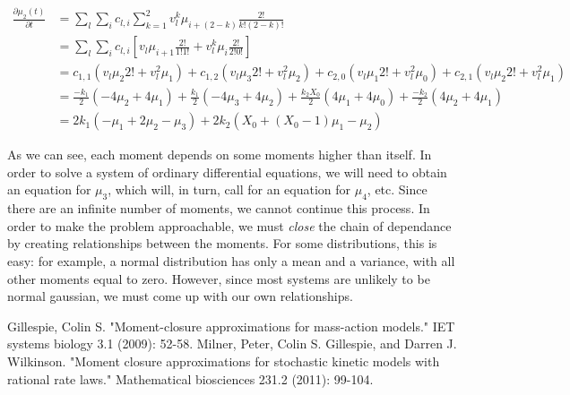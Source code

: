 \documentclass[a4paper,10pt]{article}
\begin{document}
\begin{align*}
 \frac{\partial \mu_2 (t)}{\partial t} &= \sum_l \sum_i c_{l,i} \sum_{k=1}^2 v_l^k \mu_{i+(2-k)} \frac{2!}{k!(2-k)!}\\
 &=\sum_l \sum_i c_{l,i} \left[ v_l \mu_{i+1} \frac{2!}{1!1!}+v_l^k \mu_{i} \frac{2!}{2!0!}\right]\\
 &= c_{1,1}(v_l \mu_{2} 2!+v_l^2 \mu_1)+c_{1,2}(v_l \mu_{3} 2!+v_l^2 \mu_2)+c_{2,0}(v_l \mu_{1} 2!+v_l^2 \mu_0)+c_{2,1}(v_l \mu_{2} 2!+v_l^2 \mu_1)\\
 &= \frac{-k_1}{2}(-4\mu_2+4\mu_1)+\frac{k_1}{2}(-4\mu_3+4\mu_2)+\frac{k_2 X_0}{2}(4\mu_1+4\mu_0)+\frac{-k_2}{2}(4\mu_2+4\mu_1)\\
 &=2k_1(-\mu_1+2\mu_2-\mu_3)+2k_2(X_0+(X_0-1)\mu_1-\mu_2)
\end{align*}
 
 As we can see, each moment depends on some moments higher than itself. In order to solve a system of ordinary differential equations, we will need to obtain an equation for $\mu_3$, which will, in turn, call for an equation for $\mu_4$, etc. Since there are an infinite number of moments, we cannot continue this process. In order to make the problem approachable, we must \textit{close} the chain of dependance by creating relationships between the moments. For some distributions, this is easy: for example, a normal distribution has only a mean and a variance, with all other moments equal to zero. However, since most systems are unlikely to be normal gaussian, we must come up with our own relationships. 
 
 \begin{thebibliography}{}
 	Gillespie, Colin S. "Moment-closure approximations for mass-action models." IET systems biology 3.1 (2009): 52-58.
 Milner, Peter, Colin S. Gillespie, and Darren J. Wilkinson. "Moment closure approximations for stochastic kinetic models with rational rate laws." Mathematical biosciences 231.2 (2011): 99-104.

\end{thebibliography}
 
 
\end{document}
